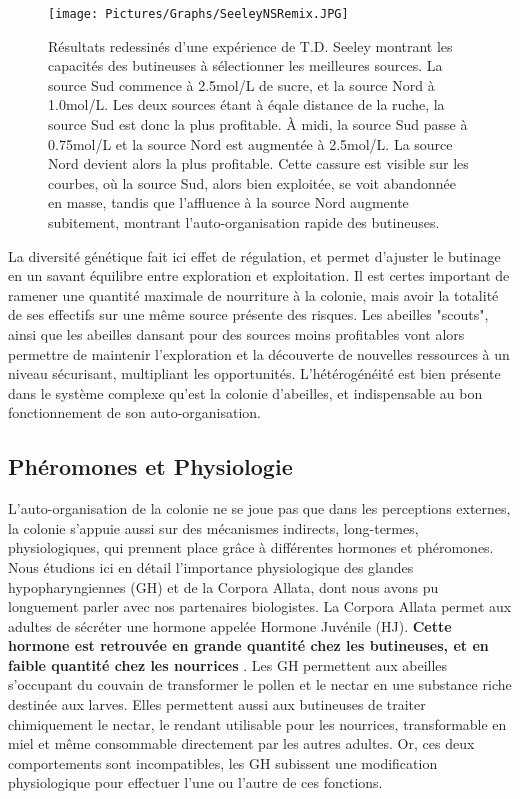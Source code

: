 			\begin{figure}
			\centering
			\texttt{[image: Pictures/Graphs/SeeleyNSRemix.JPG]}
				\caption[Résultats redessinés d'une expérience de T.D. Seeley \cite{seeley_collective_1991} montrant les capacités des butineuses à sélectionner les meilleures sources.]{Résultats redessinés d'une expérience de T.D. Seeley \cite{seeley_collective_1991} montrant les capacités des butineuses à sélectionner les meilleures sources. La source Sud commence à 2.5mol/L de sucre, et la source Nord à 1.0mol/L. Les deux sources étant à éqale distance de la ruche, la source Sud est donc la plus profitable. À midi, la source Sud passe à 0.75mol/L et la source Nord est augmentée à 2.5mol/L. La source Nord devient alors la plus profitable. Cette cassure est visible sur les courbes, où la source Sud, alors bien exploitée, se voit abandonnée en masse, tandis que l’affluence à la source Nord augmente subitement, montrant l’auto-organisation rapide des butineuses.}
			\label{SeeleyNS}
			\end{figure}
			
			La diversité génétique fait ici effet de régulation, et permet d'ajuster le butinage en un savant équilibre entre exploration et exploitation. Il est certes important de ramener une quantité maximale de nourriture à la colonie, mais avoir la totalité de ses effectifs sur une même source présente des risques. Les abeilles "scouts", ainsi que les abeilles dansant pour des sources moins profitables vont alors permettre de maintenir l'exploration et la découverte de nouvelles ressources à un niveau sécurisant, multipliant les opportunités. L'hétérogénéité est bien présente dans le système complexe qu'est la colonie d'abeilles, et indispensable au bon fonctionnement de son auto-organisation.
			
		\subsection{Phéromones et Physiologie}
			\label{subsubPhysio}
			L'auto-organisation de la colonie ne se joue pas que dans les perceptions externes, la colonie s'appuie aussi sur des mécanismes indirects, long-termes, physiologiques, qui prennent place grâce à différentes hormones et phéromones.  Nous étudions ici en détail l'importance physiologique des glandes hypopharyngiennes (GH) et de la Corpora Allata, dont nous avons pu longuement parler avec nos partenaires biologistes. La Corpora Allata permet aux adultes de sécréter une hormone appelée Hormone Juvénile (HJ). \textbf{Cette hormone est retrouvée en grande quantité chez les butineuses, et en faible quantité chez les nourrices} \cite{le_conte_primer_2001}. Les GH permettent aux abeilles s'occupant du couvain de transformer le pollen et le nectar en une substance riche destinée aux larves. Elles permettent aussi aux butineuses de traiter chimiquement le nectar, le rendant utilisable pour les nourrices, transformable en miel et même consommable directement par les autres adultes. Or, ces deux comportements sont incompatibles, les GH subissent une modification physiologique pour effectuer l'une ou l'autre de ces fonctions. 
			
